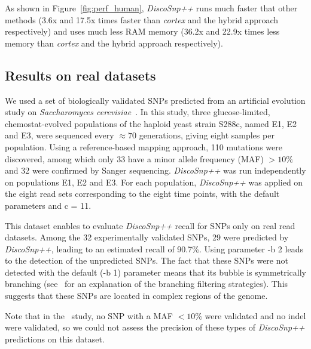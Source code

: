 \documentclass{bmcart}
\newcommand{\discopp}{{\it DiscoSnp++}\xspace}
\newcommand{\co}{{\it cortex}\xspace}
\begin{document}
As shown in Figure~\ref{fig:perf_human}, \discopp runs much faster that other methods (3.6x and 17.5x times faster than \co and the hybrid approach respectively) and uses much less RAM memory (36.2x and 22.9x times less memory than \co and the hybrid approach respectively). 






\subsection*{Results on real datasets}
We used a set of biologically validated SNPs predicted from an artificial evolution study on \emph{Saccharomyces cerevisiae}~\cite{Kvitek2013}. 
In this study, three glucose-limited, chemostat-evolved populations of the haploid yeast strain S288c, named
E1, E2 and E3, were sequenced every $\approx70$ generations, giving eight samples per population. Using a reference-based mapping approach, 110 mutations were discovered, among which only 33 have a minor allele frequency (MAF) $>10\%$ and 32 were confirmed by Sanger sequencing.  \discopp was run independently on populations E1, E2 and E3. For each population, \discopp was applied on the eight read sets corresponding to the eight time points, with the default parameters and c = 11. 

This dataset enables to evaluate \discopp recall for SNPs only on real read datasets. Among the 32 experimentally validated SNPs, 29 were predicted by \discopp, leading to an estimated recall of 90.7\%. Using parameter -b 2 leads to the detection of the unpredicted SNPs. The fact that these SNPs were not detected with the default (-b 1) parameter means that its bubble is symmetrically branching (see~\cite{Uricaru2014a} for an explanation of the branching filtering strategies). This suggests that these SNPs are located in complex regions of the genome. 


Note that in the~\cite{Kvitek2013} study, no SNP with a MAF $<10\%$ were validated and no indel were validated, so we could not assess the precision of these types of \discopp predictions on this dataset.
\end{document}
